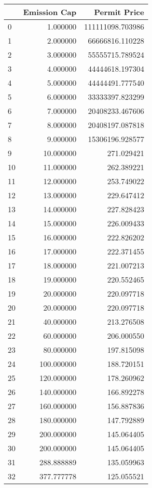 \begin{tabular}{lrr}
\toprule
 & Emission Cap & Permit Price \\
\midrule
0 & 1.000000 & 111111098.703986 \\
1 & 2.000000 & 66666816.110228 \\
2 & 3.000000 & 55555715.789524 \\
3 & 4.000000 & 44444618.197304 \\
4 & 5.000000 & 44444491.777540 \\
5 & 6.000000 & 33333397.823299 \\
6 & 7.000000 & 20408233.467606 \\
7 & 8.000000 & 20408197.087818 \\
8 & 9.000000 & 15306196.928577 \\
9 & 10.000000 & 271.029421 \\
10 & 11.000000 & 262.389221 \\
11 & 12.000000 & 253.749022 \\
12 & 13.000000 & 229.647412 \\
13 & 14.000000 & 227.828423 \\
14 & 15.000000 & 226.009433 \\
15 & 16.000000 & 222.826202 \\
16 & 17.000000 & 222.371455 \\
17 & 18.000000 & 221.007213 \\
18 & 19.000000 & 220.552465 \\
19 & 20.000000 & 220.097718 \\
20 & 20.000000 & 220.097718 \\
21 & 40.000000 & 213.276508 \\
22 & 60.000000 & 206.000550 \\
23 & 80.000000 & 197.815098 \\
24 & 100.000000 & 188.720151 \\
25 & 120.000000 & 178.260962 \\
26 & 140.000000 & 166.892278 \\
27 & 160.000000 & 156.887836 \\
28 & 180.000000 & 147.792889 \\
29 & 200.000000 & 145.064405 \\
30 & 200.000000 & 145.064405 \\
31 & 288.888889 & 135.059963 \\
32 & 377.777778 & 125.055521 \\
\bottomrule
\end{tabular}
